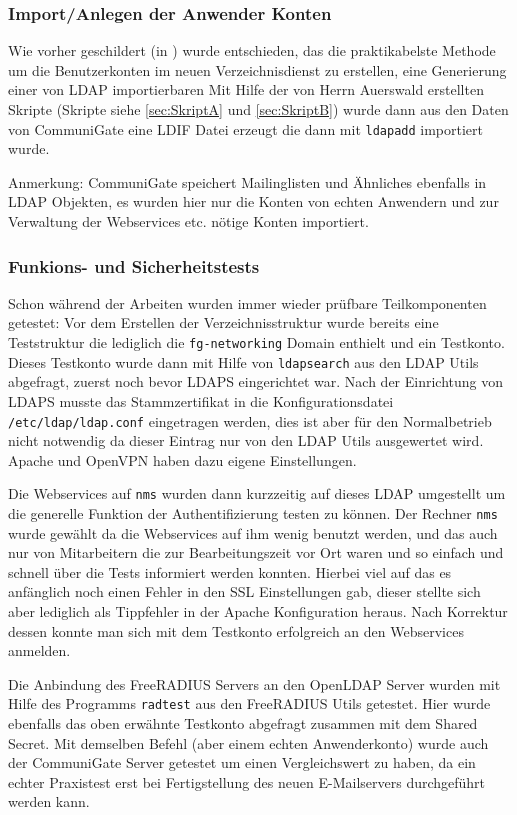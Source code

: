 \documentclass[11pt,a4paper,titlepage=firstiscover]{scrartcl} %
\begin{document}
\subsubsection{Import/Anlegen der Anwender Konten}
Wie vorher geschildert (in ) wurde entschieden, das die praktikabelste Methode um die Benutzerkonten im neuen Verzeichnisdienst zu erstellen, eine Generierung einer von LDAP importierbaren 
Mit Hilfe der von Herrn Auerswald erstellten Skripte (Skripte siehe \autoref{sec:SkriptA} und \autoref{sec:SkriptB}) wurde dann aus den Daten von CommuniGate eine LDIF Datei erzeugt die dann mit \texttt{ldapadd} importiert wurde.

Anmerkung: CommuniGate speichert Mailinglisten und Ähnliches ebenfalls in LDAP Objekten, es wurden hier nur die Konten von echten Anwendern und zur Verwaltung der Webservices etc. nötige Konten importiert.

\subsubsection{Funkions- und Sicherheitstests}
Schon während der Arbeiten wurden immer wieder prüfbare Teilkomponenten getestet: 
Vor dem Erstellen der Verzeichnisstruktur wurde bereits eine Teststruktur die lediglich die \texttt{fg-networking} Domain enthielt und ein Testkonto. Dieses Testkonto wurde dann mit Hilfe von \texttt{ldapsearch} aus den LDAP Utils abgefragt, zuerst noch bevor LDAPS eingerichtet war. Nach der Einrichtung von LDAPS musste das Stammzertifikat in die Konfigurationsdatei \texttt{/etc/ldap/ldap.conf} eingetragen werden, dies ist aber für den Normalbetrieb nicht notwendig da dieser Eintrag nur von den LDAP Utils ausgewertet wird. Apache und OpenVPN haben dazu eigene Einstellungen.

Die Webservices auf \texttt{nms} wurden dann kurzzeitig auf dieses LDAP umgestellt um die generelle Funktion der Authentifizierung testen zu können. Der Rechner \texttt{nms} wurde gewählt da die Webservices auf ihm wenig benutzt werden, und das auch nur von Mitarbeitern die zur Bearbeitungszeit vor Ort waren und so einfach und schnell über die Tests informiert werden konnten. Hierbei viel auf das es anfänglich noch einen Fehler in den SSL Einstellungen gab, dieser stellte sich aber lediglich als Tippfehler in der Apache Konfiguration heraus. Nach Korrektur dessen konnte man sich mit dem Testkonto erfolgreich an den Webservices anmelden.

Die Anbindung des FreeRADIUS Servers an den OpenLDAP Server wurden mit Hilfe des Programms \texttt{radtest} aus den FreeRADIUS Utils getestet. Hier wurde ebenfalls das oben erwähnte Testkonto abgefragt zusammen mit dem Shared Secret. Mit demselben Befehl (aber einem echten Anwenderkonto) wurde auch der CommuniGate Server getestet um einen Vergleichswert zu haben, da ein echter Praxistest erst bei Fertigstellung des neuen E-Mailservers durchgeführt werden kann.
\end{document}
